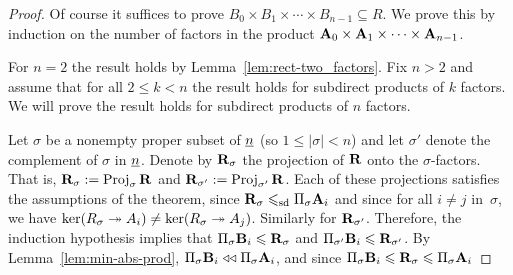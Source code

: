 \begin{proof}
  Of course it suffices to prove
  $B_0 \times B_1 \times \cdots \times B_{n-1} \subseteq R$.
  We prove this by induction on the number of factors in the product
  $\mathbf{A}_0 \times \mathbf{A}_1 \times \cdots \times \mathbf{A}_{n-1}$.

  For $n=2$ the result holds by Lemma~\ref{lem:rect-two_factors}.
  Fix $n>2$ and assume that for all $2 \leq k < n$ 
  the result holds for subdirect products of 
  $k$ factors. We will prove the result holds for subdirect products of 
  $n$ factors.

  Let $\sigma$ be a nonempty proper subset of $\underline{n}$ %
  (so $1\leq |\sigma| < n$) and let
  $\sigma'$ denote the complement of $\sigma$ in $\underline{n}$.
  Denote by $\mathbf{R}_\sigma$ the projection of $\mathbf{R}$ onto the $\sigma$-factors. 
  That is, $\mathbf{R}_\sigma := \operatorname{Proj}_\sigma \mathbf{R}$ and  $\mathbf{R}_{\sigma'}:=\operatorname{Proj}_{\sigma'} \mathbf{R}$.
  Each of these projections satisfies the assumptions
  of the theorem,
  since $\mathbf{R}_{\sigma} \leqslant_{\mathrm{sd}} \Pi_{\sigma}\mathbf{A}_i$ and since
  for all $i\neq j$ in~$\sigma$, we have
  $\ker(R_{\sigma} \twoheadrightarrow A_i) \neq \ker(R_{\sigma}\twoheadrightarrow A_j)$.
  Similarly for $\mathbf{R}_{\sigma'}$.
  Therefore, the induction hypothesis implies that %
  $\Pi_{\sigma}\mathbf{B}_i \leqslant \mathbf{R}_{\sigma}$ and
  $\Pi_{\sigma'}\mathbf{B}_i \leqslant \mathbf{R}_{\sigma'}$.
  By Lemma~\ref{lem:min-abs-prod},
  $\Pi_{\sigma}\mathbf{B}_i  \mathrel{\triangleleft\triangleleft} \Pi_{\sigma} \mathbf{A}_i$, and
  since $\Pi_{\sigma}\mathbf{B}_i \leqslant \mathbf{R}_{\sigma}\leqslant \Pi_{\sigma} \mathbf{A}_i$ 

\end{proof}
